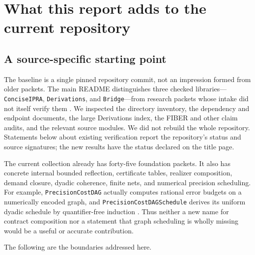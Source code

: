 \section{What this report adds to the current repository}\label{sec:scope}

\subsection{A source-specific starting point}

The baseline is a single pinned repository commit, not an impression formed from older packets. The main README distinguishes three checked libraries---\texttt{ConciseIPRA}, \texttt{Derivations}, and \texttt{Bridge}---from research packets whose intake did not itself verify them \cite{repo-readme}. We inspected the directory inventory, the dependency and endpoint documents, the large Derivations index, the FIBER and other claim audits, and the relevant source modules. We did not rebuild the whole repository. Statements below about existing verification report the repository's status and source signatures; the new results have the status declared on the title page.

The current collection already has forty-five foundation packets. It also has concrete internal bounded reflection, certificate tables, realizer composition, demand closure, dyadic coherence, finite nets, and numerical precision scheduling. For example, \nolinkurl{PrecisionCostDAG} actually computes rational error budgets on a numerically encoded graph, and \nolinkurl{PrecisionCostDAGSchedule} derives its uniform dyadic schedule by quantifier-free induction \cite{repo-dag}. Thus neither a new name for contract composition nor a statement that graph scheduling is wholly missing would be a useful or accurate contribution.

The following are the boundaries addressed here.

